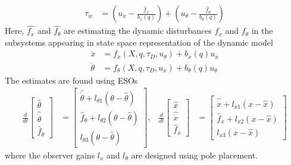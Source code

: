 \documentclass[letterpaper, 10 pt, conference]{ieeeconf}  %
\begin{document}
\begin{align}
    \tau_w &= \left( u_x - \frac{\hat{f}_x}{b_x(q)} \right) + \left( u_\theta - \frac{\hat{f}_\theta}{b_\theta(q)} \right)
\end{align}
Here, $\hat{f_x}$ and $\hat{f_{\theta}}$ are estimating the dynamic disturbances $f_x$ and $f_{\theta}$ in the subsystems appearing in state space representation of the dynamic model
\begin{align}
    \ddot{x} &= f_x(X, q, \tau_D, u_\theta) + b_x(q)u_x \nonumber \\
    \ddot{\theta} &= f_\theta(X, q, \tau_D, u_x) + b_\theta(q)u_\theta
\end{align}
The estimates are found using \aclp{ESO}
\small{
\begin{align}
    \frac{d}{dt} \!\! \begin{bmatrix} \hat\theta \\ \hat{\dot{\theta}} \\ \hat{f}_\theta \end{bmatrix} &\!\!= \!\! \begin{bmatrix} \hat{\dot{\theta}} + l_{\theta 1}(\theta-\hat\theta) \\ \hat{f}_\theta + l_{\theta 2}(\theta - \hat\theta) \\ l_{\theta 3} (\theta - \hat\theta) \end{bmatrix}\!\!, &\!\!\!\!\!
    \frac{d}{dt} \!\! \begin{bmatrix} \hat{x} \\ \hat{\dot{x}} \\ \hat{f}_x \end{bmatrix} &\!\!=\!\! \begin{bmatrix} \hat{\dot{x}} + l_{x1}(x-\hat{x}) \\ \hat{f}_x + l_{x2}(x - \hat{x}) \\ l_{x3} (x - \hat{x}) \end{bmatrix}
\end{align}}
\normalsize
where the observer gains $l_x$ and $l_{\theta}$ are designed using pole placement.


\end{document}
